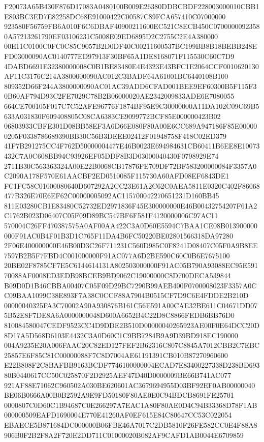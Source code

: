 \documentclass[UTF8,fontset=fandol,zihao=-4,a4paper]{ctexart}
\begin{document}
{{F20073A65B430F876D17083A0480100B009E26380DDBCBDF228003000010CBB1E803BC3ED7E82258DC68E91000422C00587C89FCA657410C07000000
923580F56759FB6A010F6C6DBAF40900211600EC521C8ECB450C07000000923580A57213261790EF03106231C5008E09ED6895D2C2755C2E4A380000
00E11C0100C0FC0C85C9057B2D0DF40C00211600537BC199BB8B18BEBB248EFD03000090AC0140777ED97913F30BF65A1DE8168071F115530C60C7D9
4DABD6691E32380000008C0B1BE83480E4E4323E43BFC1E2064CCF0010620130AF11C3176C214A3800000090AC012C3BADF64A61001BC6440108B100
809352D66F244A3800000090AC01AC39ADD6CFAD001BEE9EF60300B5F115F30B60AF794D93C2FE7029C78B2B06000020AE2342009833ADE6E7080055
664CE700105F017C7C52AFE96776F1874BF95E9C30000000A11DA102C09C69B5633A031830F609408805C08CA6383CE9099772BCF85E000000423B02
06803933CBFE301D08BB58EF3A6D66E080F80A00E6CC689A947186F85E000000205F0338786689390BB30C56B3DEEE02412F01948758F418C02ED379
41F7B291275CC4F762D50000004477E46B0023E694984631CB60411B6EE8E10073432C7A0C608BB94C93926EF05DDF8B3D03000040430F0798929E74
2711B30C563363324A00E22B0068CB17876FE709DF72BF583200000084F3357A0C2090A178F570E61AACBF2ED0510085F115730A60AFD08EF6843DE1
FC1FC58C01000080640D607292A2CC23E61A2C62C0AEA5811E0320C402F86068477B326E70E6EF62C00000005092AC115700042270651231D160BB45
811E03280CB1E83480C52732ED2971836F45E300000000E46B00432754207F61A2C1762B023D06407C05F09D89BC547BF6F581F4120000006C97AC11
570004C26FF470387575A0AF00AA422C3A0D60E5594C7BAA1CE08B013900000000F91AC0B4F01B3D1C765F11DA4B6FC50220BE02801566318DA97280
2F06E400000000E46B00D3C26F711231C560D985C0F8241D08407C05F0A9B8EE7597B2B5F7FBD4C001000000F91AC077A6D2BE590C60C0B6E7675100
20BE02F8785CF7E5C6144614131A802503000000F91AC05B790A93088EC95E59170088AF0008ED3EDB98BCEB9BD9062C19000000C8D700DECA539844
B09D0D1B46CBBA00407C05F09D29BC7290B99AEB400F0700008023F3357A0CC09BAA1099C38E893F7A38C0CCF88A7904B0515CF7D9C6E4FDDE2B210D
00000040325FA3C70002A90A930876B161C56E591A00CAE32BE611C04671DD075B52E8F7DE8A6A0000000048D600A6652B4C22D8C8866FEDB6BB76D0
810084580047CEDF9523CC4D9DDE2B510D00000040265923AE00F0E64DCC20D8D17A5D568D6103E4432C3A0D60C1C9BB7284B9A9D39BD918EC190000
004A9235E20A006FAAC20C82ED127FEF2B62316C807C8845A7012CBB2C7EBC25857E6F85C81C00000088F7C8D7004AE61191391CB010B87270960600
E22B808F2C8BAFBB9163BCDF7746100000004ECAD7E83400227338D238BD69380B0440617CC50C025870F2D2925AEF47D40D0000009BE66B741AC077
921AF88E71062C960502A030BE620601AC3679694955D03BF92EF0AB00000040BE06B0666A00B0B2592A9E9FD50180F80AE0E0C94BDCB8691FE25701
0000807C0D60C1B94687C0E266297A7EAC1A80F80AE0D4C94B33368D78F1AB000000509EAFD1690004E770E41260AF0EF615E84C80647CC53C022054
EBAECE5B871684DC000000B06FBE46A7017C2DB5810F26FE582CC0E4F88A8906B0F2B2F8A2F720E2DD711C01000020B082AF9CAFD1AB0044E6709859
}}
\end{document}
